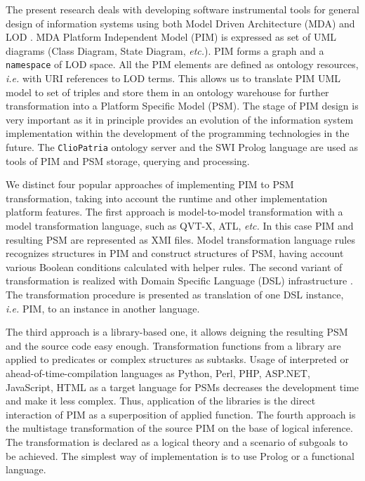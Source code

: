 \documentclass[conference,a4paper]{IEEEtran}
\begin{document}
The present research deals with developing software instrumental tools for general design of information systems using both Model Driven Architecture (MDA) and LOD \cite{MDA}.  MDA Platform Independent Model (PIM) is expressed as set of UML diagrams (Class Diagram, State Diagram, \emph{etc.}).  PIM forms a graph and a \verb~namespace~ of LOD space.  All the PIM elements are defined as ontology resources, \emph{i.e.} with URI references to LOD terms.  This allows us to translate PIM UML model to set of triples and store them in an ontology warehouse for further transformation into a Platform Specific Model (PSM). The stage of PIM design is very important as it in principle provides an evolution of the information system implementation within the development of the programming technologies in the future. %
The \verb~ClioPatria~ ontology server and the SWI Prolog language \cite{Clio} are used as tools of PIM and PSM storage, querying and processing.

We distinct four popular approaches of implementing PIM to PSM transformation, taking into account the runtime and other implementation platform features.  The first approach is model-to-model transformation with a model transformation language, such as QVT-X, ATL, \emph{etc.}  In this case PIM and resulting PSM are represented as XMI files.  Model transformation language rules recognizes structures in PIM and construct structures of PSM, having account various Boolean conditions calculated with helper rules. The second variant of transformation is realized with Domain Specific Language (DSL) infrastructure \cite{stratego}.  The transformation procedure is presented as translation of one DSL instance, \emph{i.e.} PIM, to an instance in another language.

The third approach is a library-based one, it allows deigning the resulting PSM and the source code easy enough.  Transformation functions from a library are applied to predicates or complex structures as subtasks. Usage of interpreted or ahead-of-time-compilation languages as Python, Perl, PHP, ASP.NET, JavaScript, HTML as a target language for PSMs decreases the development time and make it less complex.  Thus, application of the libraries is the direct interaction of PIM as a superposition of applied function.  The fourth approach is the multistage transformation of the source PIM \cite{tereh1} on the base of logical inference.  The transformation is declared as a logical theory and a scenario of subgoals to be achieved.  The simplest way of implementation is to use Prolog or a functional language.
\end{document}
